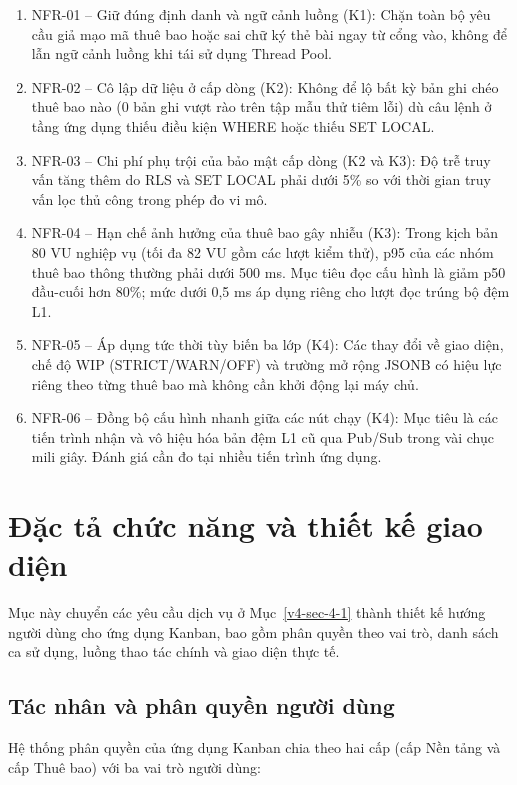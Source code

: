\begin{enumerate}
\def\labelenumi{\arabic{enumi}.}
\item
  NFR-01 -- Giữ đúng định danh và ngữ cảnh luồng (K1): Chặn toàn bộ yêu cầu giả mạo mã thuê bao hoặc sai chữ ký thẻ bài ngay từ cổng vào, không để lẫn ngữ cảnh luồng khi tái sử dụng Thread Pool.
\item
  NFR-02 -- Cô lập dữ liệu ở cấp dòng (K2): Không để lộ bất kỳ bản ghi chéo thuê bao nào (0 bản ghi vượt rào trên tập mẫu thử tiêm lỗi) dù câu lệnh ở tầng ứng dụng thiếu điều kiện WHERE hoặc thiếu SET LOCAL.
\item
  NFR-03 -- Chi phí phụ trội của bảo mật cấp dòng (K2 và K3): Độ trễ truy vấn tăng thêm do RLS và SET LOCAL phải dưới 5\% so với thời gian truy vấn lọc thủ công trong phép đo vi mô.
\item
  NFR-04 -- Hạn chế ảnh hưởng của thuê bao gây nhiễu (K3): Trong kịch bản 80 VU nghiệp vụ (tối đa 82 VU gồm các lượt kiểm thử), p95 của các nhóm thuê bao thông thường phải dưới 500 ms. Mục tiêu đọc cấu hình là giảm p50 đầu-cuối hơn 80\%; mức dưới 0,5 ms áp dụng riêng cho lượt đọc trúng bộ đệm L1.
\item
  NFR-05 -- Áp dụng tức thời tùy biến ba lớp (K4): Các thay đổi về giao diện, chế độ WIP (STRICT/WARN/OFF) và trường mở rộng JSONB có hiệu lực riêng theo từng thuê bao mà không cần khởi động lại máy chủ.
\item
  NFR-06 -- Đồng bộ cấu hình nhanh giữa các nút chạy (K4): Mục tiêu là các tiến trình nhận và vô hiệu hóa bản đệm L1 cũ qua Pub/Sub trong vài chục mili giây. Đánh giá cần đo tại nhiều tiến trình ứng dụng.
\end{enumerate}

\section{Đặc tả chức năng và thiết kế giao diện}\label{v4-sec-4-2}

Mục này chuyển các yêu cầu dịch vụ ở Mục~\ref{v4-sec-4-1} thành thiết kế hướng người dùng cho ứng dụng Kanban, bao gồm phân quyền theo vai trò, danh sách ca sử dụng, luồng thao tác chính và giao diện thực tế.

\subsection{Tác nhân và phân quyền người dùng}\label{v4-sec-4-2-1}

Hệ thống phân quyền của ứng dụng Kanban chia theo hai cấp (cấp Nền tảng và cấp Thuê bao) với ba vai trò người dùng:

